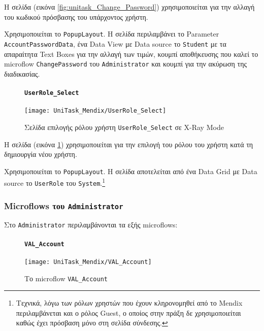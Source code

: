                     Η σελίδα (εικόνα \ref{fig:unitask_Change_Password}) χρησιμοποιείται για την αλλαγή του κωδικού πρόσβασης του υπάρχοντος χρήστη.

                    Χρησιμοποιείται το \texttt{PopupLayout}. Η σελίδα περιλαμβάνει το Parameter \linebreak \texttt{AccountPasswordData}, ένα Data View με Data source το \texttt{Student} με τα απαραίτητα Text Boxes για την αλλαγή των τιμών, κουμπί αποθήκευσης που καλεί το microflow \texttt{ChangePassword} του \texttt{Administrator} και κουμπί για την ακύρωση της διαδικασίας.

                \begin{figure}[H] \noindent
                    \paragraph{\texttt{UserRole\_Select}}
                    \begin{center}
                        \texttt{[image: UniTask\_Mendix/UserRole\_Select]}
                        \caption{\centering Σελίδα επιλογής ρόλου χρήστη \texttt{UserRole\_Select} σε X-Ray Mode}
                        \label{fig:unitask_UserRole_Select}
                    \end{center}
                \end{figure}

                    Η σελίδα (εικόνα \ref{fig:unitask_UserRole_Select}) χρησιμοποιείται για την επιλογή του ρόλου του χρήστη κατά τη δημιουργία νέου χρήστη.

                    Χρησιμοποιείται το \texttt{PopupLayout}. Η σελίδα αποτελείται από ένα Data Grid με Data source το \texttt{UserRole} του \texttt{System}.\footnote{Τεχνικά, λόγω των ρόλων χρηστών που έχουν κληρονομηθεί από το Mendix περιλαμβάνεται και ο ρόλος Guest, ο οποίος στην πράξη δε χρησιμοποιείται καθώς έχει πρόσβαση μόνο στη σελίδα σύνδεσης.}

            \subsubsection{Microflows του \texttt{Administrator}}
                Στο \texttt{Administrator} περιλαμβάνονται τα εξής microflows:

                \begin{figure}[H] \noindent
                    \paragraph{\texttt{VAL\_Account}}
                    \begin{center}
                        \texttt{[image: UniTask\_Mendix/VAL\_Account]}
                        \caption{\centering Το microflow \texttt{VAL\_Account}}
                        \label{fig:unitask_VAL_Account}
                    \end{center}
                \end{figure}

